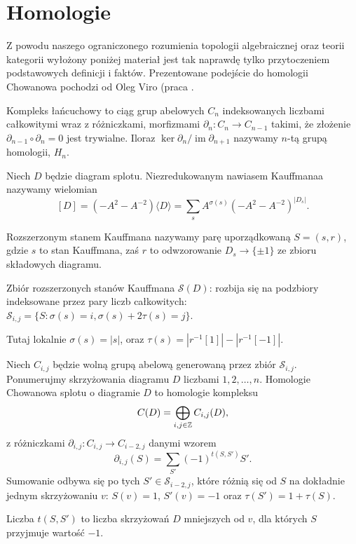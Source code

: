 \section{Homologie} %
\label{sec:homology}
Z powodu naszego ograniczonego rozumienia topologii algebraicznej oraz teorii kategorii
wyłożony poniżej materiał jest tak naprawdę tylko przytoczeniem podstawowych definicji i faktów.
Prezentowane podejście do homologii Chowanowa pochodzi od Oleg Viro (praca \cite{viro04}.

Kompleks łańcuchowy to ciąg grup abelowych $C_n$ indeksowanych liczbami całkowitymi
wraz z różniczkami, morfizmami $\partial_n \colon C_n \to C_{n-1}$ takimi,
że złożenie $\partial_{n-1} \circ \partial_n = 0$ jest trywialne.
Iloraz $\ker \partial_n / \operatorname{im} \partial_{n+1}$ nazywamy $n$-tą grupą homologii, $H_n$.


\begin{definition}
	Niech $D$ będzie diagram splotu.
	Niezredukowanym nawiasem Kauffmanaa nazywamy wielomian
	\[
		[D] = (-A^2 - A^{-2}) \langle D \rangle = \sum_s A^{\sigma(s)} (-A^2 - A^{-2})^{|D_s|}.
	\]
\end{definition}

\begin{definition}
	Rozszerzonym stanem Kauffmana nazywamy parę uporządkowaną $S = (s, r)$,
	gdzie $s$ to stan Kauffmana,
	zaś $r$ to odwzorowanie $D_s \to \{\pm 1\}$ ze zbioru składowych diagramu.
\end{definition}

\begin{definition}
	Zbiór rozszerzonych stanów Kauffmana $\mathcal S(D)$:
	rozbija się na podzbiory indeksowane przez pary liczb całkowitych:
	$\mathcal S_{i, j} = \{S : \sigma(s) = i, \sigma(s) + 2 \tau(s) = j\}$.
\end{definition}

Tutaj lokalnie $\sigma(s) = |s|$, oraz $\tau(s) = |r^{-1}[1]| - |r^{-1}[-1]|$.


\begin{definition}
	Niech $C_{i, j}$ będzie wolną grupą abelową generowaną przez zbiór $\mathcal S_{i, j}$.
	Ponumerujmy skrzyżowania diagramu $D$ liczbami $1, 2, \ldots, n$.
	Homologie Chowanowa splotu o diagramie $D$ to homologie kompleksu
	\[
		C(D) = \bigoplus_{i, j \in \mathbb Z} C_{i, j}(D),
	\]
	z różniczkami $\partial_{i, j} \colon C_{i,j} \to C_{i-2, j}$ danymi wzorem
	\[
		\partial_{i, j}(S) = \sum_{S'} (-1)^{t(S, S')}  S'.
	\]
	Sumowanie odbywa się po tych $S' \in \mathcal S_{i-2, j}$,
	które różnią się od $S$ na dokładnie jednym skrzyżowaniu $v$:
	$S(v) = 1$, $S'(v) = -1$ oraz $\tau(S') = 1 + \tau (S)$.

	Liczba $t(S, S')$ to liczba skrzyżowań $D$ mniejszych od $v$, dla których $S$ przyjmuje wartość $-1$.
\end{definition}

